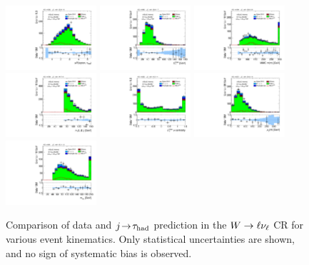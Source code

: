 \begin{figure}[tp]
  \includegraphics[width=0.30\textwidth]{figures/analysis/vbf-WlvCR/taulep-dR}
  \includegraphics[width=0.30\textwidth]{figures/analysis/vbf-WlvCR/met-pt-hi}
  \includegraphics[width=0.30\textwidth]{figures/analysis/vbf-WlvCR/mMMC}
  \includegraphics[width=0.30\textwidth]{figures/analysis/vbf-WlvCR/mT-hi}
  \includegraphics[width=0.30\textwidth]{figures/analysis/vbf-WlvCR/met-phi-centrality}
  \includegraphics[width=0.30\textwidth]{figures/analysis/vbf-WlvCR/H-pt-hi}
  \includegraphics[width=0.30\textwidth]{figures/analysis/vbf-WlvCR/mvis}
  \caption{Comparison of data and $j\!\rightarrow\!\tau_\text{had}$ prediction in the $W \rightarrow \ell\nu_\ell$ CR for various event kinematics. Only statistical uncertainties are shown, and no sign of systematic bias is observed.}
  \label{fig:backgrounds-WlvCR-taus}
\end{figure}

